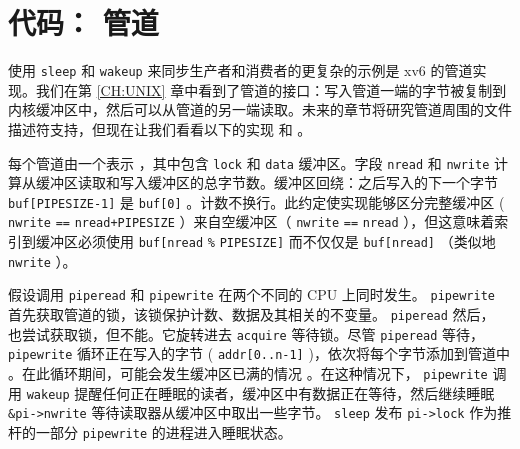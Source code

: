     \section{代码： 管道  }    
    使用    \lstinline{sleep}    和    \lstinline{wakeup}    来同步生产者和消费者的更复杂的示例是 xv6 的管道实现。我们在第    \ref{CH:UNIX}    章中看到了管道的接口：写入管道一端的字节被复制到内核缓冲区中，然后可以从管道的另一端读取。未来的章节将研究管道周围的文件描述符支持，但现在让我们看看以下的实现
        和
        。  

每个管道由一个表示
        ，其中包含
    \lstinline{lock}    和
    \lstinline{data}    缓冲区。字段
    \lstinline{nread}    和
    \lstinline{nwrite}    计算从缓冲区读取和写入缓冲区的总字节数。缓冲区回绕：之后写入的下一个字节
    \lstinline{buf[PIPESIZE-1]}    是
    \lstinline{buf[0]}    。计数不换行。此约定使实现能够区分完整缓冲区 (    \lstinline{nwrite}   
    \lstinline{==}   
    \lstinline{nread+PIPESIZE}    ）来自空缓冲区（    \lstinline{nwrite}   
    \lstinline{==}   
    \lstinline{nread}    ），但这意味着索引到缓冲区必须使用
    \lstinline{buf[nread}   
	\lstinline{%}
    \lstinline{PIPESIZE]}    而不仅仅是
    \lstinline{buf[nread]}   （类似地
    \lstinline{nwrite}    ）。  

假设调用
    \lstinline{piperead}    和
    \lstinline{pipewrite}    在两个不同的 CPU 上同时发生。
    \lstinline{pipewrite}   
        首先获取管道的锁，该锁保护计数、数据及其相关的不变量。
    \lstinline{piperead}   
 然后，       也尝试获取锁，但不能。它旋转进去
    \lstinline{acquire}   
        等待锁。尽管
    \lstinline{piperead}    等待，
    \lstinline{pipewrite}    循环正在写入的字节 (    \lstinline{addr[0..n-1]}    )，依次将每个字节添加到管道中
        。在此循环期间，可能会发生缓冲区已满的情况
        。在这种情况下，
    \lstinline{pipewrite}    调用
    \lstinline{wakeup}    提醒任何正在睡眠的读者，缓冲区中有数据正在等待，然后继续睡眠
    \lstinline{&pi->nwrite}    等待读取器从缓冲区中取出一些字节。
    \lstinline{sleep}    发布
    \lstinline{pi->lock}    作为推杆的一部分
    \lstinline{pipewrite}    的进程进入睡眠状态。  


